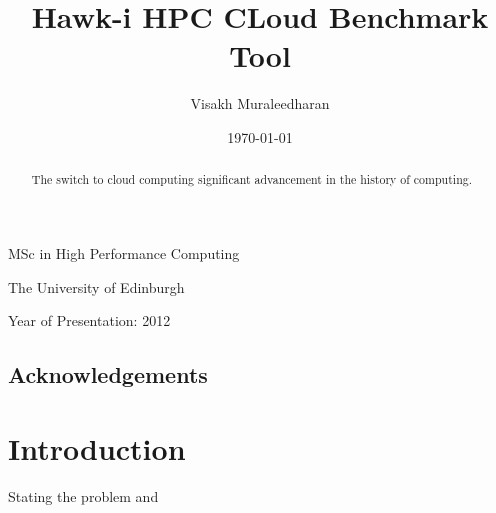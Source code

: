 \documentclass[12pt,a4paper]{report}
\begin{document}




\title{Hawk-i HPC CLoud Benchmark Tool}
\author{Visakh Muraleedharan}
\date{\today}

\makeEPCCtitle

\thispagestyle{empty}

\vspace{12cm}

\begin{center}

\large{MSc in High Performance Computing}

\large{The University of Edinburgh}

\large{Year of Presentation: 2012}

\end{center}

\newpage

\begin{abstract}
The switch to cloud computing significant advancement in the history of computing.
\end{abstract}


\tableofcontents
\listoftables
\listoffigures

\begin{titlepage}
\vspace*{2in}
\section*{Acknowledgements}

\end{titlepage}


\chapter{Introduction}
Stating the problem and 
\end{document}
